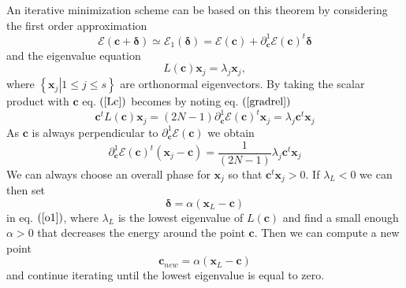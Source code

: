 \documentclass[aps,preprint]{revtex4}%
\begin{document}
An iterative minimization scheme can be based on this theorem by considering
the first order approximation
\begin{equation}
\mathcal{E}\left(  \mathbf{c}+\mathbf{\delta}\right)  \simeq\mathcal{E}%
_{1}\left(  \mathbf{\delta}\right)  =\mathcal{E}\left(  \mathbf{c}\right)
+\partial_{\mathbf{c}}^{1}\mathcal{E}\left(  \mathbf{c}\right)  ^{t}%
\mathbf{\delta} \label{o1}%
\end{equation}
and the eigenvalue equation
\begin{equation}
L\left(  \mathbf{c}\right)  \mathbf{x}_{j}=\lambda_{j}\mathbf{x}_{j}\mathbf{,}
\label{Lc}%
\end{equation}
where $\left\{  \left.  \mathbf{x}_{j}\right\vert 1\leq j\leq s\right\}  $ are
orthonormal eigenvectors. By taking the scalar product with $\mathbf{c}$ eq.
$\left(  \ref{Lc}\right)  $ becomes by noting eq. $\left(  \ref{gradrel}%
\right)  $
\begin{equation}
\mathbf{c}^{t}L\left(  \mathbf{c}\right)  \mathbf{x}_{j}=\left(  2N-1\right)
\partial_{\mathbf{c}}^{1}\mathcal{E}\left(  \mathbf{c}\right)  ^{t}%
\mathbf{x}_{j}=\lambda_{j}\mathbf{c}^{t}\mathbf{x}_{j}%
\end{equation}
As $\mathbf{c}$ is always perpendicular to $\partial_{\mathbf{c}}%
^{1}\mathcal{E}\left(  \mathbf{c}\right)  $ we obtain
\begin{equation}
\partial_{\mathbf{c}}^{1}\mathcal{E}\left(  \mathbf{c}\right)  ^{t}\left(
\mathbf{x}_{j}-\mathbf{c}\right)  =\frac{1}{\left(  2N-1\right)  }\lambda
_{j}\mathbf{c}^{t}\mathbf{x}_{j}%
\end{equation}
We can always choose an overall phase for $\mathbf{x}_{j}$ so that
$\mathbf{c}^{t}\mathbf{x}_{j}>0.$ If $\lambda_{L}<0$ we can then set
\begin{equation}
\mathbf{\delta}=\alpha\left(  \mathbf{x}_{L}-\mathbf{c}\right)
\end{equation}
in eq. $\left(  \ref{o1}\right)  $, where $\lambda_{L}$ is the lowest
eigenvalue of $L\left(  \mathbf{c}\right)  $ and find a small enough
$\alpha>0$ that decreases the energy around the point $\mathbf{c.}$ Then we
can compute a new point
\begin{equation}
\mathbf{c}_{new}=\alpha\left(  \mathbf{x}_{L}-\mathbf{c}\right)
\end{equation}
and continue iterating until the lowest eigenvalue is equal to zero.
\end{document}
